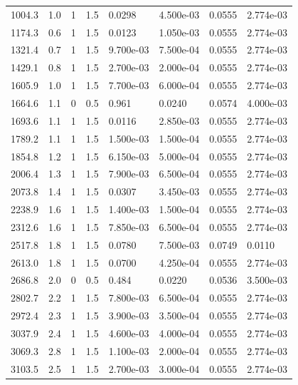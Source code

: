 \documentclass[preview]{standalone}
\begin{document}
{{\begin{tabular}{L{1.2cm}C{1.2cm} C{0.3cm}C{0.5cm} C{1.4cm}C{1.4cm} C{1.4cm}C{1.4cm}}
  1004.3  &   1.0  & 1     & 1.5 &  0.0298  & 4.500e-03  & 0.0555 &  2.774e-03   \\ 
  1174.3  &   0.6  & 1     & 1.5 &  0.0123  & 1.050e-03  & 0.0555 &  2.774e-03   \\ 
  1321.4  &   0.7  & 1     & 1.5 &  9.700e-03  & 7.500e-04  & 0.0555 &  2.774e-03   \\ 
  1429.1  &   0.8  & 1     & 1.5 &  2.700e-03  & 2.000e-04  & 0.0555 &  2.774e-03   \\ 
  1605.9  &   1.0  & 1     & 1.5 &  7.700e-03  & 6.000e-04  & 0.0555 &  2.774e-03   \\ 
  1664.6  &   1.1  & 0     & 0.5 &  0.961  & 0.0240  & 0.0574 &  4.000e-03   \\ 
  1693.6  &   1.1  & 1     & 1.5 &  0.0116  & 2.850e-03  & 0.0555 &  2.774e-03   \\ 
  1789.2  &   1.1  & 1     & 1.5 &  1.500e-03  & 1.500e-04  & 0.0555 &  2.774e-03   \\ 
  1854.8  &   1.2  & 1     & 1.5 &  6.150e-03  & 5.000e-04  & 0.0555 &  2.774e-03   \\ 
  2006.4  &   1.3  & 1     & 1.5 &  7.900e-03  & 6.500e-04  & 0.0555 &  2.774e-03   \\ 
  2073.8  &   1.4  & 1     & 1.5 &  0.0307  & 3.450e-03  & 0.0555 &  2.774e-03   \\ 
  2238.9  &   1.6  & 1     & 1.5 &  1.400e-03  & 1.500e-04  & 0.0555 &  2.774e-03   \\ 
  2312.6  &   1.6  & 1     & 1.5 &  7.850e-03  & 6.500e-04  & 0.0555 &  2.774e-03   \\ 
  2517.8  &   1.8  & 1     & 1.5 &  0.0780  & 7.500e-03  & 0.0749 &  0.0110   \\ 
  2613.0  &   1.8  & 1     & 1.5 &  0.0700  & 4.250e-04  & 0.0555 &  2.774e-03   \\ 
  2686.8  &   2.0  & 0     & 0.5 &  0.484  & 0.0220  & 0.0536 &  3.500e-03   \\ 
  2802.7  &   2.2  & 1     & 1.5 &  7.800e-03  & 6.500e-04  & 0.0555 &  2.774e-03   \\ 
  2972.4  &   2.3  & 1     & 1.5 &  3.900e-03  & 3.500e-04  & 0.0555 &  2.774e-03   \\ 
  3037.9  &   2.4  & 1     & 1.5 &  4.600e-03  & 4.000e-04  & 0.0555 &  2.774e-03   \\ 
  3069.3  &   2.8  & 1     & 1.5 &  1.100e-03  & 2.000e-04  & 0.0555 &  2.774e-03   \\ 
  3103.5  &   2.5  & 1     & 1.5 &  2.700e-03  & 3.000e-04  & 0.0555 &  2.774e-03   \\ 

\end{tabular}}}
\end{document}
